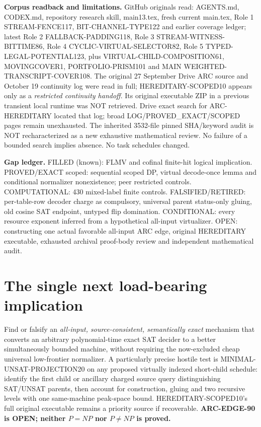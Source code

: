 \documentclass[11pt]{article}
\begin{document}
\par\noindent\textbf{Corpus readback and limitations.} GitHub originals read: AGENTS.md, CODEX.md, repository research skill, main13.tex, fresh current main.tex, Role 1 STREAM-FENCE117, BIT-CHANNEL-TYPE122 and earlier coverage ledger; latest Role 2 FALLBACK-PADDING118, Role 3 STREAM-WITNESS-BITTIME86, Role 4 CYCLIC-VIRTUAL-SELECTOR82, Role 5 TYPED-LEGAL-POTENTIAL123, plus VIRTUAL-CHILD-COMPOSITION61, MOVINGCOVER1, PORTFOLIO-PRISM101 and MAIN WEIGHTED-TRANSCRIPT-COVER108. The original 27 September Drive ARC source and October 19 continuity log were read in full; HEREDITARY-SCOPED10 appears only as a \emph{restricted continuity handoff}. Its original executable ZIP in a previous transient local runtime was NOT retrieved. Drive exact search for ARC-HEREDITARY located that log; broad LOG/PROVED_EXACT/SCOPED pages remain unexhausted. The inherited 3532-file pinned SHA/keyword audit is NOT recharacterized as a new exhaustive mathematical review. No failure of a bounded search implies absence. No task schedules changed.

\par\noindent\textbf{Gap ledger.} FILLED (known): FLMV and cofinal finite-hit logical implication. PROVED/EXACT scoped: sequential scoped DP, virtual decode-once lemma and conditional normalizer nonexistence; peer restricted controls. COMPUTATIONAL: 430 mixed-label finite controls. FALSIFIED/RETIRED: per-table-row decoder charge as compulsory, universal parent status-only gluing, old cosine SAT endpoint, untyped flip domination. CONDITIONAL: every resource exponent inferred from a hypothetical all-input virtualizer. OPEN: constructing one actual favorable all-input ARC edge, original HEREDITARY executable, exhausted archival proof-body review and independent mathematical audit.

\section{The single next load-bearing implication}
Find or falsify an \emph{all-input, source-consistent, semantically exact} mechanism that converts an arbitrary polynomial-time exact SAT decider to a better simultaneously bounded machine, without requiring the now-excluded cheap universal low-frontier normalizer. A particularly precise hostile test is MINIMAL-UNSAT-PROJECTION20 on any proposed virtually indexed short-child schedule: identify the first child or ancillary charged source query distinguishing SAT/UNSAT parents, then account for construction, gluing and two recursive levels with one same-machine peak-space bound. HEREDITARY-SCOPED10's full original executable remains a priority source if recoverable. \textbf{ARC-EDGE-90 is OPEN; neither $P=NP$ nor $P\ne NP$ is proved.}
\end{document}
